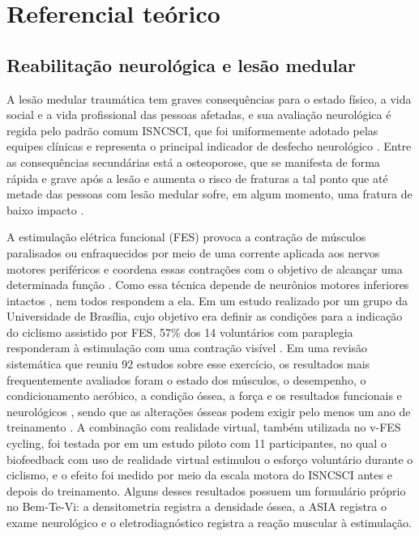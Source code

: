 \chapter{Referencial teórico}
\label{cap:referencial}


\section{Reabilitação neurológica e lesão medular}
\label{sec:ref-reabilitacao}

A lesão medular traumática tem graves consequências para o estado físico, a vida social e a vida profissional das
pessoas afetadas, e sua avaliação neurológica é regida pelo padrão comum ISNCSCI, que foi uniformemente adotado
pelas equipes clínicas e representa o principal indicador de desfecho neurológico \cite[p.~1,~8]{ahuja2017traumatic}.
Entre as consequências secundárias está a osteoporose, que se manifesta de forma rápida e grave após a lesão e
aumenta o risco de fraturas a tal ponto que até metade das pessoas com lesão medular sofre, em algum momento, uma
fratura de baixo impacto \cite[p.~278]{battaglino2012sci}.

A estimulação elétrica funcional (FES) provoca a contração de músculos paralisados ou enfraquecidos por meio de uma
corrente aplicada aos nervos motores periféricos e coordena essas contrações com o objetivo de alcançar uma
determinada função \cite[p.~327]{peckham2005fes}. Como essa técnica depende de neurônios motores inferiores
intactos \cite[p.~329]{peckham2005fes}, nem todos respondem a ela. Em um estudo realizado por um grupo da
Universidade de Brasília, cujo objetivo era definir as condições para a indicação do ciclismo assistido por FES,
57\% dos 14 voluntários com paraplegia responderam à estimulação com uma contração visível
\cite[p.~209,~211]{guimaraes2016fes}. Em uma revisão sistemática que reuniu 92 estudos sobre esse exercício, os
resultados mais frequentemente avaliados foram o estado dos músculos, o desempenho, o condicionamento aeróbico, a
condição óssea, a força e os resultados funcionais e neurológicos \cite[p.~1,~8]{vanderscheer2021fes}, sendo que as
alterações ósseas podem exigir pelo menos um ano de treinamento \cite[p.~10]{vanderscheer2021fes}. A combinação com
realidade virtual, também utilizada no v-FES cycling, foi testada por  em um
estudo piloto com 11 participantes, no qual o biofeedback com uso de realidade virtual estimulou o esforço
voluntário durante o ciclismo, e o efeito foi medido por meio da escala motora do ISNCSCI antes e depois do
treinamento. Alguns desses resultados possuem um formulário próprio no Bem-Te-Vi: a densitometria registra a
densidade óssea, a ASIA registra o exame neurológico e o eletrodiagnóstico registra a reação muscular à
estimulação.

